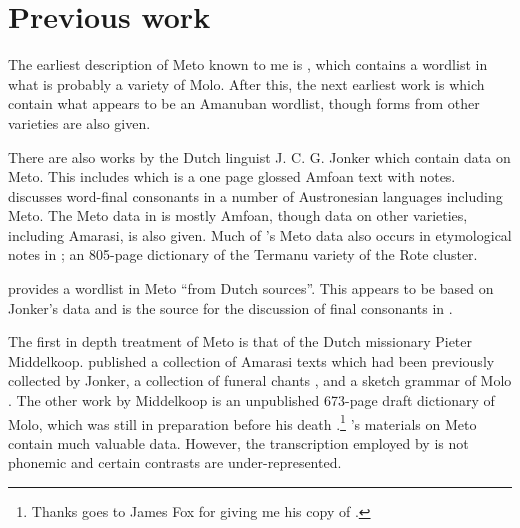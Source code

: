 \section{Previous work}\label{sec:PreWor}
The earliest description of Meto known to me is \cite{mu57},
which contains a wordlist in what is probably a variety of Molo.
After this, the next earliest work is \cite{kl94}
which contain what appears to be an Amanuban wordlist,
though forms from other varieties are also given.

There are also works by the Dutch linguist
J. C. G. Jonker which contain data on Meto.
This includes \cite[270f]{jo04} which is a one page
glossed Amfo{\Q}an text with notes.
\cite{jo06} discusses word-final consonants in a number of
Austronesian languages including Meto.
The Meto data in \cite{jo06} is mostly Amfo{\Q}an, though data on
other varieties, including Amarasi, is also given.
Much of \citeauthor{jo06}'s Meto data also
occurs in etymological notes in \cite{jo08};
an 805-page dictionary of the Termanu variety of the Rote cluster.

\cite{ca44} provides a wordlist in Meto ``from Dutch sources''.
This appears to be based on Jonker's data
and \cite{jo06} is the source for
the discussion of final consonants in \cite[29]{ca44c}.

The first in depth treatment of Meto is that
of the Dutch missionary Pieter Middelkoop.
\citeauthor{mi39} published a collection of Amarasi texts \citep{mi39}
which had been previously collected by Jonker, a collection
of funeral chants \citep{mi49}, and a sketch grammar of Molo \citep{mi50}.
The other work by Middelkoop is an unpublished 673-page draft dictionary of Molo,
which was still in preparation before his death \citep{mi72}.\footnote{
		Thanks goes to James Fox for giving me his copy of \cite{mi72}.}
\citeauthor{mi39}'s materials on Meto contain much valuable data.
However, the transcription employed by \citeauthor{mi39} is not phonemic
and certain contrasts are under-represented.
%

